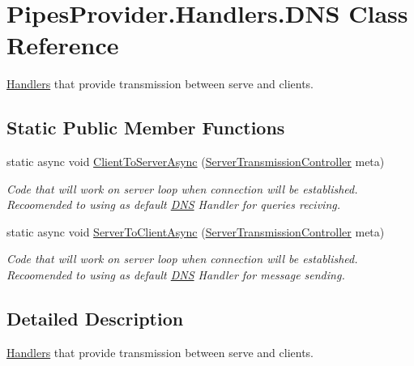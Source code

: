 \hypertarget{class_pipes_provider_1_1_handlers_1_1_d_n_s}{}\section{Pipes\+Provider.\+Handlers.\+D\+NS Class Reference}
\label{class_pipes_provider_1_1_handlers_1_1_d_n_s}


\mbox{\hyperlink{namespace_pipes_provider_1_1_handlers}{Handlers}} that provide transmission between serve and clients.  


\subsection*{Static Public Member Functions}
\begin{DoxyCompactItemize}
\item 
static async void \mbox{\hyperlink{class_pipes_provider_1_1_handlers_1_1_d_n_s_a367bb1e465456ed8d76a85157ce80cb6}{Client\+To\+Server\+Async}} (\mbox{\hyperlink{class_pipes_provider_1_1_server_1_1_server_transmission_controller}{Server\+Transmission\+Controller}} meta)
\begin{DoxyCompactList}\small\item\em Code that will work on server loop when connection will be established. Recoomended to using as default \mbox{\hyperlink{class_pipes_provider_1_1_handlers_1_1_d_n_s}{D\+NS}} Handler for queries reciving. \end{DoxyCompactList}\item 
static async void \mbox{\hyperlink{class_pipes_provider_1_1_handlers_1_1_d_n_s_af67546f286d7bbd49cdf2cf36836298a}{Server\+To\+Client\+Async}} (\mbox{\hyperlink{class_pipes_provider_1_1_server_1_1_server_transmission_controller}{Server\+Transmission\+Controller}} meta)
\begin{DoxyCompactList}\small\item\em Code that will work on server loop when connection will be established. Recoomended to using as default \mbox{\hyperlink{class_pipes_provider_1_1_handlers_1_1_d_n_s}{D\+NS}} Handler for message sending. \end{DoxyCompactList}\end{DoxyCompactItemize}


\subsection{Detailed Description}
\mbox{\hyperlink{namespace_pipes_provider_1_1_handlers}{Handlers}} that provide transmission between serve and clients. 



